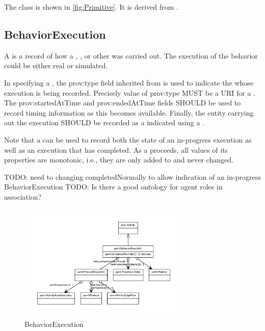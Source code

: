 %
The  class is shown in \ref{fig:Primitive}. It is derived from .%
%
\subsection{BehaviorExecution}%
\label{sec:labop:BehaviorExecution}%
A  is a record of how a , , or other  was carried out.
        The execution of the behavior could be either real or simulated.

        In specifying a , the prov:type field inherited from  is used to indicate the
         whose execution is being recorded. Precisely  value of prov:type MUST be a URI for a .
        The prov:startedAtTime and prov:endedAtTime fields SHOULD be used to record timing information as this becomes
        available.
        Finally, the entity carrying out the execution SHOULD be recorded as a  indicated using a
        .

        Note that a  can be used to record both the state of an in-progress execution as well as an
        execution that has completed. As a  proceeds, all values of its properties are monotonic,
        i.e., they are only added to and never changed.

        TODO: need to changing completedNormally to allow indication of an in-progress BehaviorExecution
        TODO: Is there a good ontology for agent roles in association?%
\newline%
\linebreak%


\begin{figure}[h!]%
\centering%
\includegraphics[width=0.7327659574468085\textwidth]{labop_classes/BehaviorExecution_abstraction_hierarchy.pdf}%
\caption{BehaviorExecution}%
\label{fig:BehaviorExecution}%
\end{figure}

